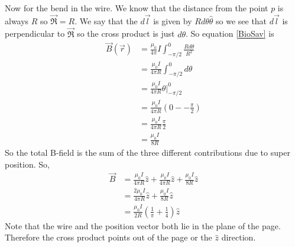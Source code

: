 \documentclass[11pt]{article}
\numberwithin{equation}{section}
\newcommand{\scrptR}{\vec{\mathfrak{R}}}
\begin{document}
Now for the bend in the wire. We know that the distance from the point $p$ is always $R$ so $\scrptR=R$. We say that the $d\vec{l}$ is given by $Rd\theta\hat{\theta}$ so we see that $d\vec{l}$ is perpendicular to $\scrptR$ so the cross product is just $d\theta$. So equation \ref{BioSav} is
\begin{align*}
\vec{B}(\vec{r}) &= \frac{\mu_0}{4\pi} I\int_{-\pi/2}^{0} \frac{Rd\theta}{R^2}\\
&= \frac{\mu_0I}{4\pi R}\int_{-\pi/2}^{0} d\theta\\
&= \frac{\mu_0I}{4\pi R}\left.\theta\right|_{-\pi/2}^{0} \\
&= \frac{\mu_0I}{4\pi R}\left(0--\frac{\pi}{2}\right) \\
&= \frac{\mu_0I}{4\pi R}\frac{\pi}{2} \\
&= \frac{\mu_0I}{8 R}
\end{align*}
So the total B-field is the sum of the three different contributions due to super position. So,
\begin{align*}
\vec{B} &= \frac{\mu_0I}{4\pi R}\hat{z} + \frac{\mu_0I}{4\pi R}\hat{z} + \frac{\mu_0I}{8 R}\hat{z}\\
&= \frac{2\mu_0I}{4\pi R}\hat{z} + \frac{\mu_0I}{8 R}\hat{z}\\
&= \frac{\mu_0I}{2R}\left(\frac{1}{\pi}+\frac{1}{4}\right)\hat{z} 
\end{align*}
Note that the wire and the position vector both lie in the plane of the page. Therefore the cross product points out of the page or the $\hat{z}$ direction.
\end{document}
